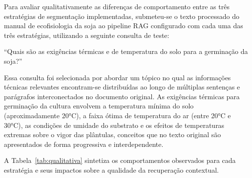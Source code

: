 \documentclass[
	12pt,				%
	openright,			%
	oneside,			%
	a4paper,			%
	tccpreliminar,		%
	]{ABNT-DC-UEL}
\begin{document}
Para avaliar qualitativamente as diferenças de comportamento entre as três estratégias de segmentação implementadas, submeteu-se o texto processado do manual de ecofisiologia da soja ao pipeline RAG configurado com cada uma das três estratégias, utilizando a seguinte consulta de teste:

\begin{citacao}
``Quais são as exigências térmicas e de temperatura do solo para a germinação da soja?''
\end{citacao}

Essa consulta foi selecionada por abordar um tópico no qual as informações técnicas relevantes encontram-se distribuídas ao longo de múltiplas sentenças e parágrafos interconectados no documento original. As exigências térmicas para germinação da cultura envolvem a temperatura mínima do solo (aproximadamente 20°C), a faixa ótima de temperatura do ar (entre 20°C e 30°C), as condições de umidade do substrato e os efeitos de temperaturas extremas sobre o vigor das plântulas, conceitos que no texto original são apresentados de forma progressiva e interdependente.

A Tabela~\ref{tab:qualitativa} sintetiza os comportamentos observados para cada estratégia e seus impactos sobre a qualidade da recuperação contextual.
\end{document}

